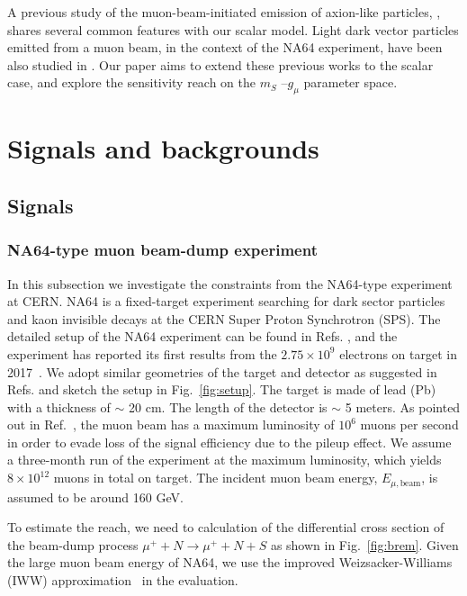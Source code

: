 \documentclass[prd,onecolumn,notitlepage,
nofootinbib,aps,tightenlines,
preprintnumbers,amsmath,amssymb,amsfonts,showpacs,superscriptaddress]{revtex4-1}
\newcommand{\yz}[1]{\textcolor{blue}{\textbf{[YZ: #1]}}}
\begin{document}
%
%
%
A previous study of the muon-beam-initiated emission of axion-like particles, \cite{Essig:2010gu}, shares several common features 
with our scalar model. Light dark vector particles emitted from a muon beam, in the context of the NA64 experiment,  have been also studied in \cite{Gninenko:2014pea}. Our paper aims to extend 
these previous works to the scalar case, and explore the sensitivity reach on the $ m_S$ --$g_\mu$
parameter space. 


\section{Signals and backgrounds}
\label{signalsandbackgrounds}
\subsection{Signals}
\subsubsection{NA64-type muon beam-dump experiment}
In this subsection we investigate the constraints from the NA64-type experiment at CERN.
NA64 is a fixed-target experiment searching for dark sector particles and kaon invisible decays at the CERN Super Proton Synchrotron (SPS).
The detailed setup of the NA64 experiment can be found in Refs. \cite{Andreas:2013lya,Gninenko:2014pea}, and the experiment has reported its first results from the $2.75\times 10^9$ electrons on target in 2017~\cite{Banerjee:2016tad}.
We adopt similar geometries of the target and detector as suggested in Refs. \cite{Andreas:2013lya,Gninenko:2014pea} and sketch the setup in Fig.~\ref{fig:setup}.  The target is made of lead (Pb) with a thickness of $\sim$ 20 cm. The length of the detector is $\sim$ 5 meters. As pointed out in Ref.~\cite{Gninenko:2014pea}, the muon beam has a maximum luminosity of $10^6$ muons per second in order to evade loss of the signal efficiency due to the pileup effect. We assume a three-month run of the experiment at the maximum luminosity,
which yields $8\times 10^{12}$ muons in total on target.  The incident muon beam energy, $E_{\mu, \text{beam}}$, is assumed to be around 160 GeV. 


To estimate the reach, we need to calculation of the differential cross section of the beam-dump process  $\mu^+ + N \to \mu^+ + N + S$ as shown in Fig.~\ref{fig:brem}. 
Given the large muon beam energy of NA64, we use the improved Weizsacker-Williams (IWW) approximation~\cite{Kim:1973he} in the evaluation.
\end{document}
